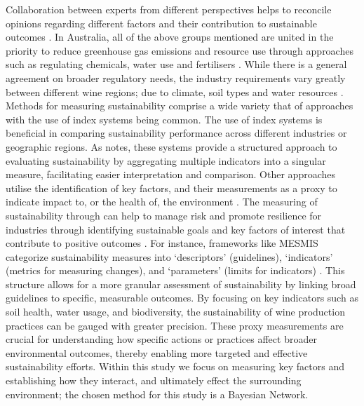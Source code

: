 \documentclass[fleqn,10pt]{wlscirep}
\begin{document}
Collaboration between experts from different perspectives helps to reconcile opinions regarding different factors and their contribution to sustainable outcomes . In Australia, all of the above groups mentioned are united in the priority to reduce greenhouse gas emissions and resource use through approaches such as regulating chemicals, water use and fertilisers . While there is a general agreement on broader regulatory needs, the industry requirements vary greatly between different wine regions; due to climate, soil types and water resources .
% 
Methods for measuring sustainability comprise a wide variety that of approaches with the use of index systems being common. The use of index systems is beneficial in comparing sustainability performance across different industries or geographic regions. As  notes, these systems provide a structured approach to evaluating sustainability by aggregating multiple indicators into a singular measure, facilitating easier interpretation and comparison.
Other approaches utilise the identification of key factors, and their measurements as a proxy to indicate impact to, or the health of, the environment . The measuring of sustainability through can help to manage risk and promote resilience for industries through identifying sustainable goals and key factors of interest that contribute to positive outcomes . For instance, frameworks like MESMIS categorize sustainability measures into `descriptors' (guidelines), `indicators' (metrics for measuring changes), and `parameters' (limits for indicators) . This structure allows for a more granular assessment of sustainability by linking broad guidelines to specific, measurable outcomes. By focusing on key indicators such as soil health, water usage, and biodiversity, the sustainability of wine production practices can be gauged with greater precision. These proxy measurements are crucial for understanding how specific actions or practices affect broader environmental outcomes, thereby enabling more targeted and effective sustainability efforts. Within this study we focus on measuring key factors and establishing how they interact, and ultimately effect the surrounding environment; the chosen method for this study is a Bayesian Network.
\end{document}
